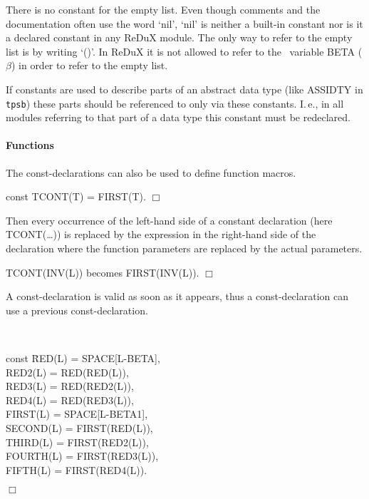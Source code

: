 There is no constant for the empty list. Even though comments and the
documentation often use the word `nil', `nil' is neither a built-in constant
nor is it a declared constant in any ReDuX module.
The only way to refer to the empty list is by writing `()'.
In ReDuX it is not allowed to refer to the \ALDES\ variable BETA ($\beta$)
in order to refer to the empty list.

If constants are used to describe parts of an abstract data type
(like ASSIDTY in {\tt tpsb}) these parts should be referenced to only via these
constants.
I.\,e., in all modules referring to that part of a data type this constant must
be redeclared.

\paragraph{Functions}
The const-declarations can also be used to define function macros.
\begin{example} 
   const TCONT(T) = FIRST(T). \hfill $\Box$
\end{example}
Then every occurrence of the left-hand side of a constant declaration
(here TCONT(\ldots)) is replaced by the expression in the right-hand side of
the declaration where the function parameters are replaced by the actual 
parameters.
\begin{example} 
 TCONT(INV(L)) becomes FIRST(INV(L)).  \hfill $\Box$
\end{example}
A const-declaration is valid as soon as it appears, thus a const-declaration
can use a previous const-declaration.
\begin{example} \label{ex:sel} \null \\
\begin{tabbing}
 const         \= RED(L)    = SPACE[L-BETA], \\
               \> RED2(L)   = RED(RED(L)), \\
               \> RED3(L)   = RED(RED2(L)), \\
               \> RED4(L)   = RED(RED3(L)), \\
               \> FIRST(L)  = SPACE[L-BETA1], \\
               \> SECOND(L) = FIRST(RED(L)), \\
               \> THIRD(L)  = FIRST(RED2(L)), \\
               \> FOURTH(L) = FIRST(RED3(L)), \\
               \> FIFTH(L)  = FIRST(RED4(L)). 
\end{tabbing}
\hspace*{\fill} $\Box$
\end{example}
